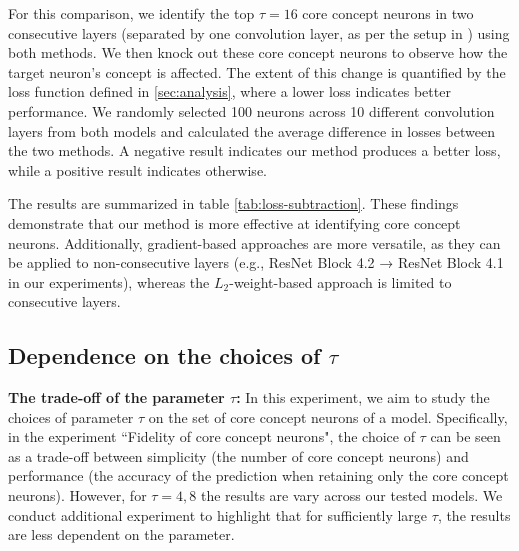{For this comparison, we identify the top $\tau = 16$ core concept neurons in two consecutive layers (separated by one convolution layer, as per the setup in \citet{Olah}) using both methods. We then knock out these core concept neurons to observe how the target neuron’s concept is affected. The extent of this change is quantified by the loss function defined in \ref{sec:analysis}, where a lower loss indicates better performance. We randomly selected 100 neurons across 10 different convolution layers from both models and calculated the average difference in losses between the two methods. A negative result indicates our method produces a better loss, while a positive result indicates otherwise.}

{The results are summarized in table \ref{tab:loss-subtraction}. These findings demonstrate that our method is more effective at identifying core concept neurons. Additionally, gradient-based approaches are more versatile, as they can be applied to non-consecutive layers (e.g., ResNet Block 4.2 → ResNet Block 4.1 in our experiments), whereas the $L_2$-weight-based approach is limited to consecutive layers.}

\begin{table}[t]
\caption{{Average subtraction of the losses. Negative means our loss is better and vice versa}}
\label{tab:loss-subtraction}
\begin{center}
\renewcommand{\arraystretch}{1.2}
\end{center}
\end{table}


\subsection{{Dependence on the choices of $\tau$}}
\label{sec:choice_of_tau}
{\textbf{The trade-off of the parameter $\tau$:} In this experiment, we aim to study the choices of parameter $\tau$ on the set of core concept neurons of a model. Specifically, in the experiment ``Fidelity of core concept neurons", the choice of $\tau$ can be seen as a trade-off between simplicity (the number of core concept neurons) and performance (the accuracy of the prediction when retaining only the core concept neurons). However, for $\tau = 4, 8$ the results are vary across our tested models. We conduct additional experiment to highlight that for sufficiently large $\tau$, the results are less dependent on the parameter.}

